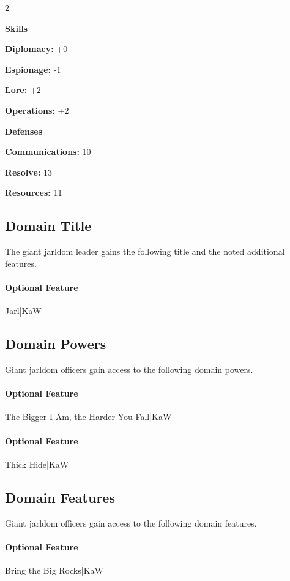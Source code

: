 \documentclass[10pt,a4paper,twoside,bg=print,twocolumn,openany,nodeprecatedcode]{dndbook}
\begin{document}
\begin{itemize}
\begin{multicols}{2}
\item \textbf{Skills}
\item \textbf{Diplomacy:} +0
\item \textbf{Espionage:} -1
\item \textbf{Lore:} +2
\item \textbf{Operations:} +2
\item \textbf{Defenses}
\item \textbf{Communications:} 10
\item \textbf{Resolve:} 13
\item \textbf{Resources:} 11
\end{multicols}

\end{itemize}

\subsection{Domain Title}
The giant jarldom leader gains the following title and the noted additional features.

\paragraph{Optional Feature}
Jarl|KaW

\subsection{Domain Powers}
Giant jarldom officers gain access to the following domain powers.

\paragraph{Optional Feature}
The Bigger I Am, the Harder You Fall|KaW

\paragraph{Optional Feature}
Thick Hide|KaW

\subsection{Domain Features}
Giant jarldom officers gain access to the following domain features.

\paragraph{Optional Feature}
Bring the Big Rocks|KaW
\end{document}
